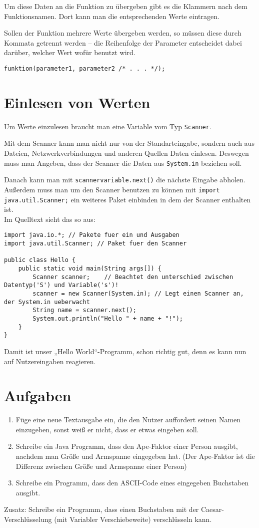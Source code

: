 Um diese Daten an die Funktion zu übergeben gibt es die Klammern nach dem Funktionsnamen. Dort kann man die entsprechenden Werte eintragen.

Sollen der Funktion mehrere Werte übergeben werden, so müssen diese durch Kommata getrennt werden – die Reihenfolge der Parameter entscheidet dabei darüber, welcher Wert wofür benutzt wird.
\begin{lstlisting}
funktion(parameter1, parameter2 /* . . . */);
\end{lstlisting}

\section {Einlesen von Werten}
Um Werte einzulesen braucht man eine Variable vom Typ \lstinline$Scanner$. 

Mit dem Scanner kann man nicht nur von der Standarteingabe, sondern auch aus Dateien, Netzwerkverbindungen und anderen Quellen Daten einlesen. 
Deswegen muss man Angeben, dass der Scanner die Daten aus \lstinline$System.in$ beziehen soll.

Danach kann man mit \lstinline$scannervariable.next()$ die nächste Eingabe abholen.
Außerdem muss man um den Scanner benutzen zu können mit \lstinline$import java.util.Scanner;$ ein weiteres Paket einbinden in dem der Scanner enthalten ist. \\
Im Quelltext sieht das so aus:
\begin{lstlisting}
import java.io.*; // Pakete fuer ein und Ausgaben
import java.util.Scanner; // Paket fuer den Scanner

public class Hello {
	public static void main(String args[]) {
		Scanner scanner;	// Beachtet den unterschied zwischen Datentyp('S') und Variable('s')!
		scanner = new Scanner(System.in); // Legt einen Scanner an, der System.in ueberwacht
		String name = scanner.next();
		System.out.println("Hello " + name + "!");
	}
}
\end{lstlisting}
Damit ist unser „Hello World“-Programm, schon richtig gut, denn es kann nun auf Nutzereingaben reagieren.

\section {Aufgaben}
\begin{enumerate}
\item Füge eine neue Textausgabe ein, die den Nutzer auffordert seinen Namen einzugeben, sonst weiß er nicht, dass er etwas eingeben soll.
\item Schreibe ein Java Programm, dass den Ape-Faktor einer Person ausgibt, nachdem man Größe und Armspanne eingegeben hat. (Der Ape-Faktor ist die Differenz zwischen Größe und Armspanne einer Person)
\item Schreibe ein Programm, dass den ASCII-Code eines eingegeben Buchstaben ausgibt.
\end{enumerate}

Zusatz: Schreibe ein Programm, dass einen Buchstaben mit der Caesar-Verschlüsselung (mit Variabler Verschiebeweite) verschlüsseln kann.
